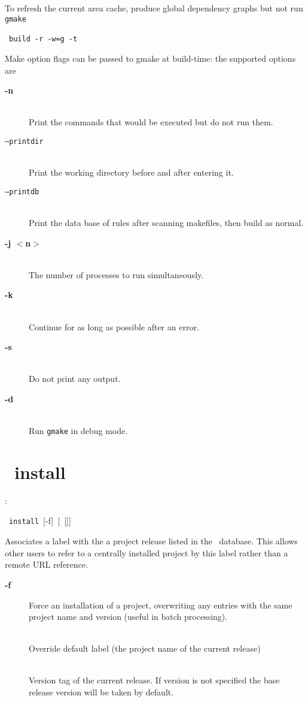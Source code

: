 \mbox{}
To refresh the current area cache, produce global dependency graphs but not run \texttt{gmake}

\hspace{5mm}\scram~\texttt{build}~\texttt{-r}~\texttt{-w=g}~\texttt{-t}

\ni Make option flags can be passed to gmake at build-time: the supported options are
\begin{description}
\item[\textbf{-n}]\mbox{}\\               
  Print the commands that would be executed but do not run them.
\item[\texttt{--printdir}]\mbox{}\\
  Print the working directory before and after entering it.
\item[\texttt{--printdb}]\mbox{}\\ 
  Print the data base of rules after scanning makefiles, then build as normal.
\item[\textbf{-j $<$n$>$}]\mbox{}\\
  The number of processes to run simultaneously.
\item[\textbf{-k}]\mbox{}\\
  Continue for as long as possible after an error.
\item[\textbf{-s}]\mbox{}\\ 
  Do not print any output.
\item[\textbf{-d}]\mbox{}\\
  Run \texttt{gmake} in debug mode.
\end{description}

\section{\scram\ install}

\cmdintro:

\hspace{5mm}\scram~\texttt{install}~[-f]~[~[]] 

\ni Associates a label with the a project release listed in the \scram\ database.
This allows other users to refer to a centrally installed project by
this label rather than a remote URL reference.

\begin{description}
\item[\textbf{-f}]
  Force an installation of a project, overwriting any entries
  with the same project name and version (useful in batch processing).
\item[]\mbox{}\\
  Override default label (the project
  name of the current release)
\item[]\mbox{}\\
  Version tag of the current release. If version is not specified the base release version will be taken by default.
\end{description}

